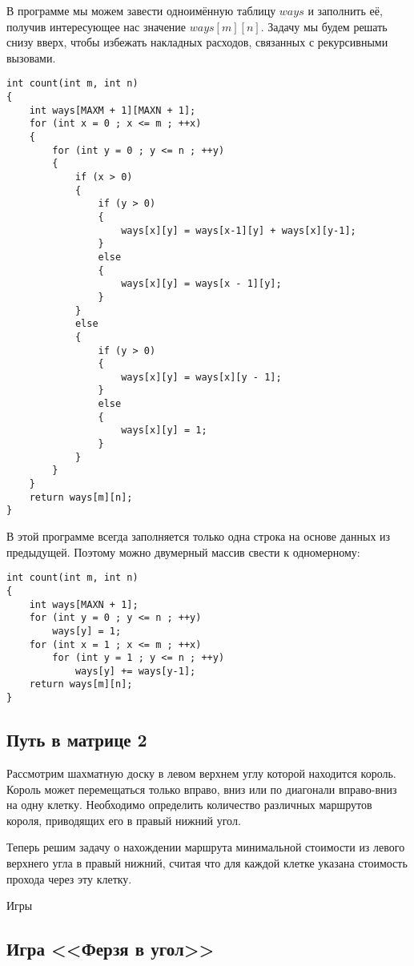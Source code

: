 \documentclass[14pt]{book}
\begin{document}
В программе мы можем завести одноимённую таблицу $ways$ и заполнить её, получив интересующее
нас значение $ways[m][n]$. Задачу мы будем решать снизу вверх, чтобы избежать накладных
расходов, связанных с рекурсивными вызовами.

\begin{lstlisting}
int count(int m, int n)
{
    int ways[MAXM + 1][MAXN + 1];
    for (int x = 0 ; x <= m ; ++x)
    {
        for (int y = 0 ; y <= n ; ++y)
        {
            if (x > 0)
            {
                if (y > 0)
	            {
                    ways[x][y] = ways[x-1][y] + ways[x][y-1];
	            }
                else
                {
                    ways[x][y] = ways[x - 1][y];
                }
            }
            else
            {
                if (y > 0)
                {
                    ways[x][y] = ways[x][y - 1];
                }
                else
                {
                    ways[x][y] = 1;
                }
            }
        }
    }
    return ways[m][n];
}
\end{lstlisting}

В этой программе всегда заполняется только одна строка на основе данных из предыдущей.
Поэтому можно двумерный массив свести к одномерному:

\begin{lstlisting}
int count(int m, int n)
{
    int ways[MAXN + 1];
    for (int y = 0 ; y <= n ; ++y)
        ways[y] = 1;
    for (int x = 1 ; x <= m ; ++x)
        for (int y = 1 ; y <= n ; ++y)
       	    ways[y] += ways[y-1];
    return ways[m][n];
}
\end{lstlisting}

\subsection{Путь в матрице 2}

Рассмотрим шахматную доску в левом верхнем углу которой находится король. Король может перемещаться только вправо, вниз или по диагонали вправо-вниз на одну клетку. Необходимо определить количество различных маршрутов короля, приводящих его в правый нижний угол.

Теперь решим задачу о нахождении маршрута минимальной стоимости из левого верхнего угла в правый нижний, считая что для каждой клетке указана стоимость прохода через эту клетку.

Игры

\subsection{Игра <<Ферзя в угол>>}
\end{document}
